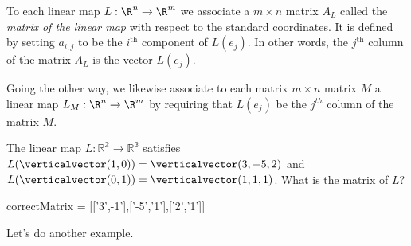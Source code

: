 \documentclass{ximera}
\begin{document}
\begin{definition}
  To each linear map $L: \R^n \to \R^m$ we associate a $m \times n$
  matrix $A_L$ called the \textit{matrix of the linear map} with
  respect to the standard coordinates.  It is defined by setting
  $a_{i,j}$ to be the $i^{\text{th}}$ component of $L(e_j)$.  In other words,
  the $j^{\text{th}}$ column of the matrix $A_L$ is the vector $L(e_j)$.

  Going the other way, we likewise associate to each matrix $m \times
  n$ matrix $M$ a linear map $L_M: \R^n \to \R^m$ by requiring that
  $L(e_j)$ be the $j^{th}$ column of the matrix $M$.
\end{definition}

\begin{question}
  The linear map $L:\mathbb{R^2}\to\mathbb{R^3}$ satisfies
  $L(\verticalvector(1,0)) = \verticalvector(3,-5,2)$ and
  $L(\verticalvector(0,1)) = \verticalvector(1,1,1)$.  What is the
  matrix of $L$?

  \begin{solution}
    \begin{matrix-answer}[name=L]
      correctMatrix = [['3',-1'],['-5','1'],['2','1']]
    \end{matrix-answer}    
  \end{solution}
\end{question}

Let's do another example.
\end{document}
